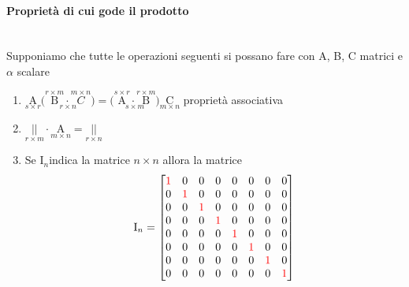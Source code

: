 \paragraph{Proprietà di cui gode il prodotto}\mbox{}\\
Supponiamo che tutte le operazioni seguenti si possano fare con A, B, C matrici 
e $\alpha$ scalare 
\begin{enumerate}
    \item $\underset{s\times r}{\textrm{A}}
        \Big(
        \underset{r\times n}{\overset{r\times m}{\textrm{B}}\cdot\overset{m\times n}{C}}
        \Big)
        =
        \Big(
        \underset{s\times m}{\overset{s\times r}{\textrm{A}}\cdot\overset{r\times m}{\textrm{B}}}
        \Big)
        \underset{m\times n}{\textrm{C}}$
        proprietà associativa

    \item $\underset{r\times m}{||}\cdot\underset{m\times n}{\textrm{A}}=\underset{r\times n}{||}$
    \item Se I$_n$indica la matrice $n\times n$ allora la matrice\\

        $$\textrm{I}_n=
        \begin{bmatrix}
            {\color{red}1} & 0 & 0 & 0 & 0 & 0 & 0 & 0 \\ 
            0 & {\color{red}1} & 0 & 0 & 0 & 0 & 0 & 0 \\ 
            0 & 0 & {\color{red}1} & 0 & 0 & 0 & 0 & 0 \\ 
            0 & 0 & 0 & {\color{red}1} & 0 & 0 & 0 & 0 \\ 
            0 & 0 & 0 & 0 & {\color{red}1} & 0 & 0 & 0 \\ 
            0 & 0 & 0 & 0 & 0 & {\color{red}1} & 0 & 0 \\ 
            0 & 0 & 0 & 0 & 0 & 0 & {\color{red}1} & 0 \\ 
            0 & 0 & 0 & 0 & 0 & 0 & 0 & {\color{red}1} 
        \end{bmatrix}
        $$


\end{enumerate}
